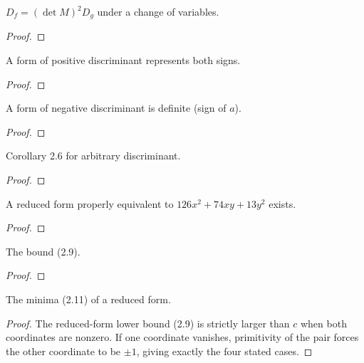 \begin{theorem}[Exercise 2.3]
  \label{exr:s2_3}
  \leanok
  $D_f = (\det M)^2 D_g$ under a change of variables.
\end{theorem}
\begin{proof}\leanok{}\end{proof}

\begin{theorem}[Exercise 2.4(a)]
  \label{exr:s2_4_a}
  \leanok
  A form of positive discriminant represents both signs.
\end{theorem}
\begin{proof}\end{proof}

\begin{theorem}[Exercise 2.4(b)]
  \label{exr:s2_4_b}
  \leanok
  A form of negative discriminant is definite (sign of $a$).
\end{theorem}
\begin{proof}\end{proof}

\begin{theorem}[Exercise 2.5]
  \label{exr:s2_5}
  \leanok
  Corollary 2.6 for arbitrary discriminant.
\end{theorem}
\begin{proof}\end{proof}

\begin{theorem}[Exercise 2.6]
  \label{exr:s2_6}
  \leanok
  A reduced form properly equivalent to $126x^2+74xy+13y^2$ exists.
\end{theorem}
\begin{proof}\end{proof}

\begin{theorem}[Exercise 2.7]
  \label{exr:s2_7}
  \leanok
  The bound (2.9).
\end{theorem}
\begin{proof}\end{proof}

\begin{theorem}[Exercise 2.8(a)]
  \label{exr:s2_8_a}
  \leanok
  The minima (2.11) of a reduced form.
\end{theorem}
\begin{proof}\leanok{}
The reduced-form lower bound (2.9) is strictly larger than $c$ when both
coordinates are nonzero. If one coordinate vanishes, primitivity of the pair
forces the other coordinate to be $\pm1$, giving exactly the four stated cases.
\end{proof}

